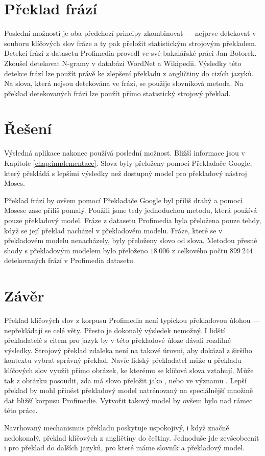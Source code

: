 \section{Překlad frází}

Poslední možností je oba předchozí principy zkombinovat --- nejprve detekovat v souboru klíčových slov fráze a ty pak přeložit statistickým strojovým překladem. Detekci frází z datasetu Profimedia provedl ve své bakalářské práci\cite{botorek} Jan Botorek. Zkoušel detekovat N-gramy v databázi WordNet\cite{wordnet} a Wikipedii. Výsledky této detekce frází lze použít právě ke zlepšení překladu z angličtiny do cizích jazyků. Na slova, která nejsou detekována ve frázi, se použije slovníková metoda. Na překlad detekovaných frází lze použít přímo statistický strojový překlad.


\section{Řešení}

Výsledná aplikace nakonec používá poslední možnost. Bližší informace jsou v Kapitole \ref{chap:implementace}. Slova byly přeloženy pomocí Překladače Google, který překládá s lepšími výsledky než dostupný model pro překladový nástroj Moses.

Překlad frází by ovšem pomocí Překladače Google byl příliš drahý a pomocí Mosese zase příliš pomalý. Použili jsme tedy jednoduchou metodu, která používá pouze překladový model. Fráze z datasetu Profimedia byla přeložena pouze tehdy, když se její překlad nacházel v překladovém modelu. Fráze, které se v překladovém modelu nenacházely, byly přeloženy slovo od slova. Metodou přesné shody s překladovým modelem bylo přeloženo $18\ 006$ z celkového počtu $899\ 244$ detekovaných frází v Profimedia datasetu.

\section{Závěr}

Překlad klíčových slov z korpusu Profimedia není typickou překladovou úlohou --- nepřekládají se celé věty. Přesto je dokonalý výsledek nemožný. I lidští překladatelé s citem pro jazyk by v této překladové úloze dávali rozdílné výsledky. Strojový překlad zdaleka není na takové úrovni, aby dokázal z širšího kontextu vybrat správný překlad. Navíc lidský překladatel může u překladu klíčových slov využít přímo obrázek, ke kterému se klíčová slova vztahují. Může tak z obrázku posoudit, zda má slovo  přeložit jako , nebo ve významu . Lepší překlad by mohl přinést překladový model natrénovaný na speciálnější množině dat bližší korpusu Profimedie. Vytvořit takový model by ovšem bylo nad rámec této práce.

Navrhovaný mechanismus překladu poskytuje uspokojivý, i když značně nedokonalý, překlad klíčových z angličtiny do češtiny. Jednoduše jde zevšeobecnit i pro překlad do dalších jazyků, pro které máme slovník a překladový model.

